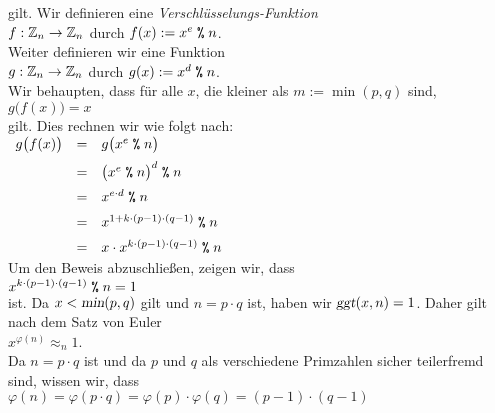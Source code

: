 gilt.  
Wir definieren eine \emph{Verschlüsselungs-Funktion}
\\[0.2cm]
\hspace*{1.3cm}
$f: \mathbb{Z}_{n} \rightarrow \mathbb{Z}_{n}$ \quad durch \quad $f(x) := x^e \;\texttt{\%}\; n$.
\\[0.2cm]
Weiter definieren wir eine Funktion
\\[0.2cm]
\hspace*{1.3cm}
$g: \mathbb{Z}_{n} \rightarrow \mathbb{Z}_{n}$ \quad durch \quad $g(x) := x^d \;\texttt{\%}\; n$.
\\[0.2cm]
Wir behaupten, dass für alle $x$, die kleiner als $m := \min(p,q)$ sind, 
\\[0.2cm]
\hspace*{1.3cm}
$g\bigl(f(x)\bigr) = x$ 
\\[0.2cm]
gilt.  Dies rechnen wir wie folgt nach:
\\[0.2cm]
\hspace*{1.3cm}
$
\begin{array}[t]{lcl}
  g\bigl(f(x)\bigr) & = & g\bigl(x^e \;\texttt{\%}\; n\bigr)                      \\[0.2cm]
                    & = & \bigl(x^e \;\texttt{\%}\; n\bigr)^d \;\texttt{\%}\; n           \\[0.2cm]
                    & = & x^{e \cdot d} \;\texttt{\%}\; n                         \\[0.2cm]
                    & = & x^{1 + k \cdot (p-1) \cdot (q-1)} \;\texttt{\%}\; n     \\[0.2cm]
                    & = & x \cdot x^{k \cdot (p-1) \cdot (q-1)} \;\texttt{\%}\; n 
\end{array}
$
\\[0.2cm]
Um den Beweis abzuschließen, zeigen wir, dass
\\[0.2cm]
\hspace*{1.3cm}
$x^{k \cdot (p-1) \cdot (q-1)} \;\texttt{\%}\; n = 1$
\\[0.2cm]
ist.   Da $x < \textsl{min}(p,q)$ gilt und $n = p \cdot q$ ist, haben wir $\textsl{ggt}(x,n) = 1$.
Daher gilt nach dem Satz von Euler 
\\[0.2cm]
\hspace*{1.3cm}
$x^{\varphi(n)} \approx_n 1$.
\\[0.2cm]
Da $n = p \cdot q$ ist und da $p$ und $q$ als verschiedene Primzahlen sicher teilerfremd sind, wissen
wir, dass
\\[0.2cm]
\hspace*{1.3cm}
$\varphi(n) = \varphi(p \cdot q) = \varphi(p) \cdot \varphi(q) = (p-1) \cdot (q-1)$
\\[0.2cm]
